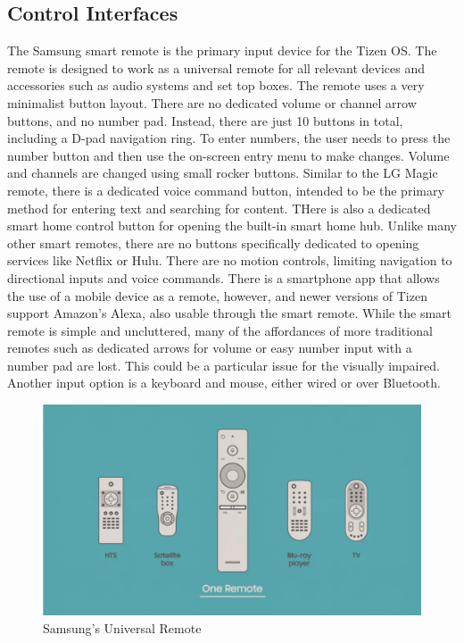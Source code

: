 \documentclass[12pt, letterpaper]{article}
\begin{document}
\subsection{Control Interfaces}
The Samsung smart remote is the primary input device for the Tizen OS. The remote is designed to work as a universal remote for all relevant devices and accessories such as audio systems and set top boxes. The remote uses a very minimalist button layout.  There are no dedicated volume or channel arrow buttons, and no number pad.  Instead, there are just 10 buttons in total, including a D-pad navigation ring.  To enter numbers, the user needs to press the number button and then use the on-screen entry menu to make changes. Volume and channels are changed using small rocker buttons. 
Similar to the LG Magic remote, there is a dedicated voice command button, intended to be the primary method for entering text and searching for content.  THere is also a dedicated smart home control button for opening the built-in smart home hub. Unlike many other smart remotes, there are no buttons specifically dedicated to opening services like Netflix or Hulu. There are no motion controls, limiting navigation to directional inputs and voice commands.  There is a smartphone app that allows the use of a mobile device as a remote, however, and newer versions of Tizen support Amazon's Alexa, also usable
through the smart remote.  While the smart remote is simple and uncluttered, many of the affordances of more traditional remotes such as dedicated arrows for volume or easy number input with a number pad are lost.  This could be a particular issue for the visually impaired.  Another input option is a keyboard and mouse, either wired or over Bluetooth.
\begin{figure}
    \includegraphics[width=\textwidth]{Screenshot 2021-04-24 110158.png}
    \caption{Samsung's Universal Remote}
\end{figure}
\end{document}

